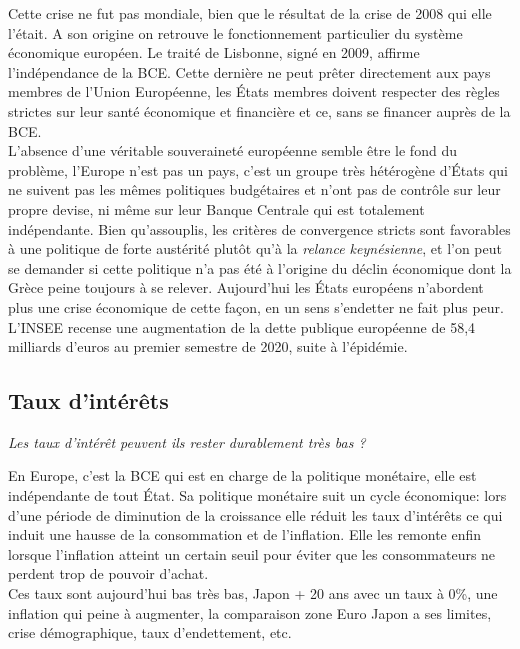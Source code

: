 \documentclass[main.tex]{subfiles}
\begin{document}
Cette crise ne fut pas mondiale, bien que le résultat de la crise de 2008 qui elle l'était. A son origine on retrouve le fonctionnement particulier du système économique européen. Le traité de Lisbonne, signé en 2009, affirme l'indépendance de la BCE. Cette dernière ne peut prêter directement aux pays membres de l'Union Européenne, les États membres doivent respecter des règles strictes sur leur santé économique et financière et ce, sans se financer auprès de la BCE. \\

L'absence d'une véritable souveraineté européenne semble être le fond du problème, l'Europe n'est pas un pays, c'est un groupe très hétérogène d'États qui ne suivent pas les mêmes politiques budgétaires et n'ont pas de contrôle sur leur propre devise, ni même sur leur Banque Centrale qui est totalement indépendante.
Bien qu'assouplis, les critères de convergence stricts sont favorables à une politique de forte austérité plutôt qu'à la \emph{relance keynésienne}, et l'on peut se demander si cette politique n'a pas été à l'origine du déclin économique dont la Grèce peine toujours à se relever. Aujourd'hui les États européens n'abordent plus une crise économique de cette façon, en un sens s'endetter ne fait plus peur. L'INSEE recense une augmentation de la dette publique européenne de 58,4 milliards d'euros au premier semestre de 2020, suite à l'épidémie.

\subsection{Taux d'intérêts}

\textit{Les taux d'intérêt peuvent ils rester durablement très bas ?}

\bigskip

En Europe, c'est la BCE qui est en charge de la politique monétaire, elle est indépendante de tout État. Sa politique monétaire suit un cycle économique: lors d'une période de diminution de la croissance elle réduit les taux d'intérêts ce qui induit une hausse de la consommation et de l'inflation. Elle les remonte enfin lorsque l'inflation atteint un certain seuil pour éviter que les consommateurs ne perdent trop de pouvoir d'achat. \\

Ces taux sont aujourd'hui bas très bas, Japon + 20 ans avec un taux à 0\%, une inflation qui peine à augmenter, la comparaison zone Euro Japon a ses limites, crise démographique, taux d'endettement, etc.
\end{document}

